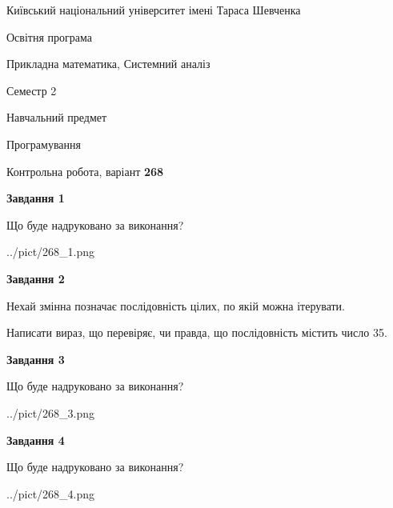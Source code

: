 \documentclass[12pt, ukrainian]{article}
\begin{document}
{{\begin {small}\par
{ \center  Київський національний університет імені Тараса Шевченка \par}
{\parbox {5 cm}{Освітня програма \hfill}{\parbox {8 cm}{Прикладна математика, Системний аналіз \hfill}}\parbox {5 cm}{\hfill Семестр 2}}\par
{\parbox {5 cm} {Навчальний предмет \hfill}\parbox {7 cm}{Програмування \hfill}\parbox {6cm}{\hfill}\par}\vspace{-7pt} \end{small}}{\center Контрольна робота, варіант  \No \textbf
{ 268 }\par}}
{
\begin {large}
{\begin {center}\textbf{Завдання 1}\end {center}}\par
Що буде надруковано за виконання?\par\par
\begin{center}
	{../pict/268_1.png}
\end{center}
\newpage

{\begin {center}\textbf{Завдання 2}\end {center}}\par
Нехай змінна  позначає послідовність цілих, по якій можна ітерувати.

Написати вираз, що перевіряє, чи правда, що послідовність  містить число 35.\par
\newpage

{\begin {center}\textbf{Завдання 3}\end {center}}\par
Що буде надруковано за виконання?
\begin{center}
	{../pict/268_3.png}
\end{center}
\newpage

{\begin {center}\textbf{Завдання 4}\end {center}}\par
Що буде надруковано за виконання?\par
\begin{center}
	{../pict/268_4.png}
\end{center}
\newpage


\end{large}}
\end{document}
